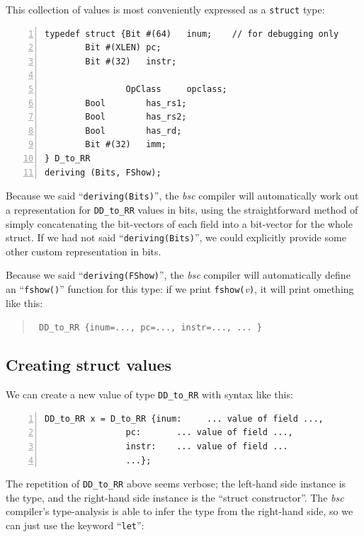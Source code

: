 This collection of values is most conveniently expressed as a
\verb|struct| type:

\begin{Verbatim}[frame=single, numbers=left]
typedef struct {Bit #(64)   inum;    // for debugging only
		Bit #(XLEN) pc;
		Bit #(32)   instr;

                OpClass     opclass;
		Bool        has_rs1;
		Bool        has_rs2;
		Bool        has_rd;
		Bit #(32)   imm;
} D_to_RR
deriving (Bits, FShow);
\end{Verbatim}


Because we said ``\verb|deriving(Bits)|'', the \emph{bsc} compiler
will automatically work out a representation for \verb|DD_to_RR|
values in bits, using the straightforward method of simply
concatenating the bit-vectors of each field into a bit-vector for the
whole struct.  If we had not said ``\verb|deriving(Bits)|'', we could
explicitly provide some other custom representation in bits.


Because we said ``\verb|deriving(FShow)|'', the \emph{bsc} compiler
will automatically define an ``\verb|fshow()|'' function for this
type: if we print \verb|fshow(|\emph{v}\verb|)|, it will print
omething like this:

\begin{quote}\tt
DD\_to\_RR \{inum=..., pc=..., instr=..., ... \}
\end{quote}


\subsection{Creating struct values}


We can create a new value of type \verb|DD_to_RR| with syntax like
this:

\begin{Verbatim}[frame=single, numbers=left]
      DD_to_RR x = D_to_RR {inum:     ... value of field ...,
			    pc:       ... value of field ...,
			    instr:    ... value of field ...
			    ...};
\end{Verbatim}

The repetition of \verb|DD_to_RR| above seems verbose; the left-hand
side instance is the type, and the right-hand side instance is the
``struct constructor''. The \emph{bsc} compiler's type-analysis is
able to infer the type from the right-hand side, so we can just use
the keyword ``\verb|let|'':

